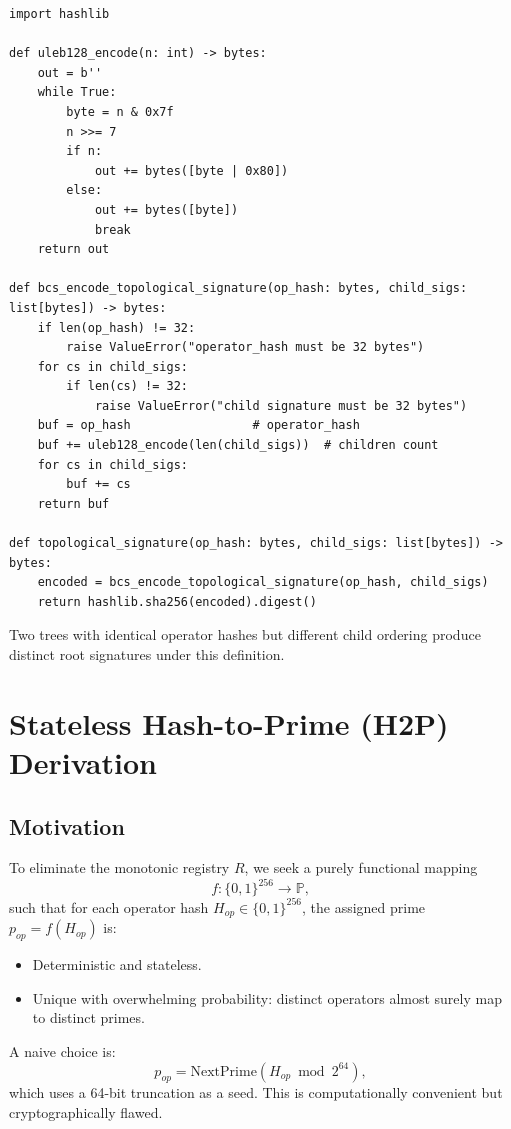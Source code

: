 \documentclass[11pt]{article}
\begin{document}
\begin{lstlisting}
import hashlib

def uleb128_encode(n: int) -> bytes:
    out = b''
    while True:
        byte = n & 0x7f
        n >>= 7
        if n:
            out += bytes([byte | 0x80])
        else:
            out += bytes([byte])
            break
    return out

def bcs_encode_topological_signature(op_hash: bytes, child_sigs: list[bytes]) -> bytes:
    if len(op_hash) != 32:
        raise ValueError("operator_hash must be 32 bytes")
    for cs in child_sigs:
        if len(cs) != 32:
            raise ValueError("child signature must be 32 bytes")
    buf = op_hash                 # operator_hash
    buf += uleb128_encode(len(child_sigs))  # children count
    for cs in child_sigs:
        buf += cs
    return buf

def topological_signature(op_hash: bytes, child_sigs: list[bytes]) -> bytes:
    encoded = bcs_encode_topological_signature(op_hash, child_sigs)
    return hashlib.sha256(encoded).digest()
\end{lstlisting}

Two trees with identical operator hashes but different child ordering produce distinct root signatures under this definition.

\section{Stateless Hash-to-Prime (H2P) Derivation}

\subsection{Motivation}

To eliminate the monotonic registry \( R \), we seek a purely functional mapping
\[
  f : \{0,1\}^{256} \to \mathbb{P},
\]
such that for each operator hash \( H_{op} \in \{0,1\}^{256} \), the assigned prime \( p_{op} = f(H_{op}) \) is:

\begin{itemize}[leftmargin=*]
  \item Deterministic and stateless.
  \item Unique with overwhelming probability: distinct operators almost surely map to distinct primes.
\end{itemize}

A naive choice is:
\[
  p_{op} = \text{NextPrime}(H_{op} \bmod 2^{64}),
\]
which uses a 64-bit truncation as a seed. This is computationally convenient but cryptographically flawed.
\end{document}
